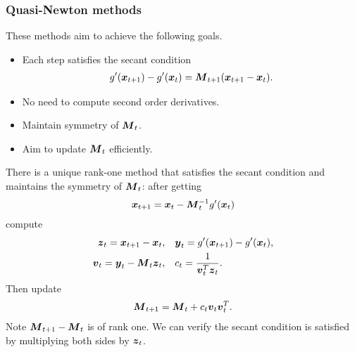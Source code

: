   \begin{frame}
  \frametitle{Quasi-Newton methods}
  These methods aim to achieve the following goals.
  \begin{itemize}
  \item Each step satisfies the secant condition
    \begin{align*}
      g'(\boldsymbol{x}_{t+1}) - g'(\boldsymbol{x}_t) = \boldsymbol{M}_{t+1}(\boldsymbol{x}_{t+1} - \boldsymbol{x}_t).
    \end{align*}
  \item No need to compute second order derivatives.
  \item Maintain symmetry of $\boldsymbol{M}_t$.
  \item Aim to update $\boldsymbol{M}_t$ efficiently.
  \end{itemize}

  \end{frame}

  \begin{frame}
  There is a unique rank-one method that satisfies the
  secant condition and maintains the symmetry of $\boldsymbol{M}_t$: after
  getting
  \begin{align*}
    \boldsymbol{x}_{t+1} = \boldsymbol{x}_t - \boldsymbol{M}_t^{-1} g'(\boldsymbol{x}_t)
  \end{align*}
  compute
  \begin{align*}
    \boldsymbol{z}_t= \boldsymbol{x}_{t+1} - \boldsymbol{x}_t, &\quad
    \boldsymbol{y}_t= g'(\boldsymbol{x}_{t+1}) - g'(\boldsymbol{x}_t), \\
    \boldsymbol{v}_t= \boldsymbol{y}_t - \boldsymbol{M}_t \boldsymbol{z}_t, &\quad
    c_t= \frac{1}{\boldsymbol{v}_t\sp{T} \boldsymbol{z}_t}.
  \end{align*}
  Then update
  \begin{align*}
    \boldsymbol{M}_{t+1} = \boldsymbol{M}_t + c_t \boldsymbol{v}_t \boldsymbol{v}_t\sp{T}.
  \end{align*}
  Note $\boldsymbol{M}_{t+1}-\boldsymbol{M}_t$ is of rank one. We can verify the secant condition is satisfied by multiplying both sides by $\boldsymbol{z}_t$. 


  \end{frame}

%
%

